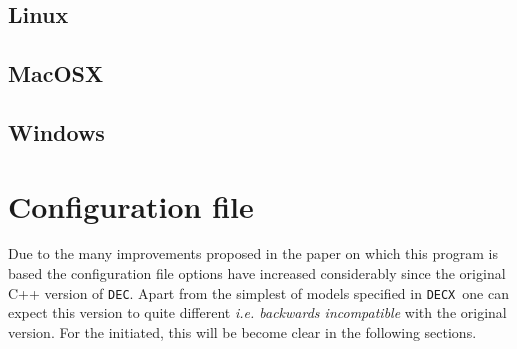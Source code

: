 \documentclass[12pt,a4]{article}
\newcommand{\DECX}{\texttt{DECX}}
\newcommand{\DEC}{\texttt{DEC}}
\begin{document}
\subsection{Linux}

\subsection{MacOSX}

\subsection{Windows}

\section{Configuration file}
Due to the many improvements proposed in the paper on which this program is based the configuration file options have increased considerably since the original C++ version of \DEC. Apart from the simplest of models specified in \DECX\, one can expect this version to quite different \textit{i.e. backwards incompatible} with the original version. For the initiated, this will be become clear in the following sections.
\end{document}
